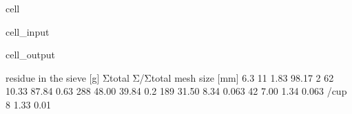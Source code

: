 \documentclass[letterpaper,10pt,english]{jupyterBook}
\begin{document}
\begin{sphinxuseclass}{cell}
\begin{sphinxVerbatimInput}
\begin{sphinxuseclass}{cell_input}
\end{sphinxuseclass}\end{sphinxVerbatimInput}
\begin{sphinxVerbatimOutput}

\begin{sphinxuseclass}{cell_output}
\begin{sphinxVerbatim}[commandchars=\\\{\}]
                residue in the sieve [g]  Σtotal \PYGZpc{}  Σ/Σtotal \PYGZpc{}
mesh size [mm]                                                
6.3                                   11      1.83       98.17
2                                     62     10.33       87.84
0.63                                 288     48.00       39.84
0.2                                  189     31.50        8.34
0.063                                 42      7.00        1.34
\PYGZlt{} 0.063 /cup                           8      1.33        0.01
\end{sphinxVerbatim}

\end{sphinxuseclass}\end{sphinxVerbatimOutput}

\end{sphinxuseclass}
\end{document}

